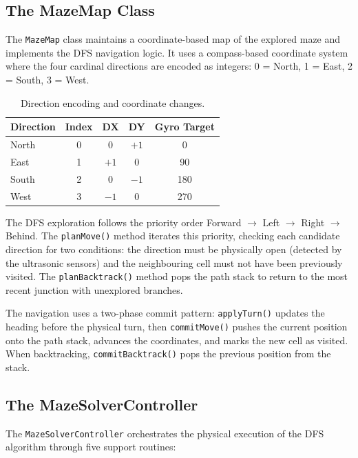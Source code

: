 \subsection{The MazeMap Class}
\label{sec:mazemap}

The \texttt{MazeMap} class maintains a coordinate-based map of the explored maze and implements the DFS navigation logic. It uses a compass-based coordinate system where the four cardinal directions are encoded as integers: 0 = North, 1 = East, 2 = South, 3 = West.

\begin{table}[htbp]
\centering
\caption{Direction encoding and coordinate changes.}
\label{tab:directions}
\begin{tabular}{l c c c c}
\hline
\textbf{Direction} & \textbf{Index} & \textbf{DX} & \textbf{DY} & \textbf{Gyro Target} \\
\hline
North & 0 & 0  & $+1$ & 0\textdegree{} \\
East  & 1 & $+1$ & 0  & 90\textdegree{} \\
South & 2 & 0  & $-1$ & 180\textdegree{} \\
West  & 3 & $-1$ & 0  & 270\textdegree{} \\
\hline
\end{tabular}
\end{table}

The DFS exploration follows the priority order Forward $\rightarrow$ Left $\rightarrow$ Right $\rightarrow$ Behind. The \texttt{planMove()} method iterates this priority, checking each candidate direction for two conditions: the direction must be physically open (detected by the ultrasonic sensors) and the neighbouring cell must not have been previously visited. The \texttt{planBacktrack()} method pops the path stack to return to the most recent junction with unexplored branches.

The navigation uses a two-phase commit pattern: \texttt{applyTurn()} updates the heading before the physical turn, then \texttt{commitMove()} pushes the current position onto the path stack, advances the coordinates, and marks the new cell as visited. When backtracking, \texttt{commitBacktrack()} pops the previous position from the stack.


\subsection{The MazeSolverController}
\label{sec:ms-controller}

The \texttt{MazeSolverController} orchestrates the physical execution of the DFS algorithm through five support routines:

